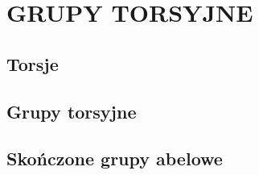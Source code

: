 \section{GRUPY TORSYJNE}

\subsection{Torsje}

\subsection{Grupy torsyjne}

\subsection{Skończone grupy abelowe}